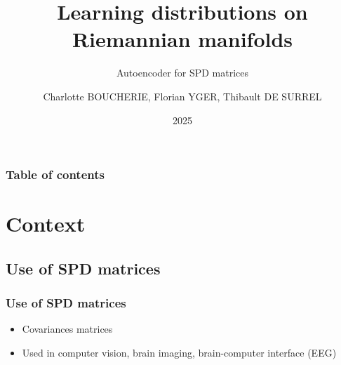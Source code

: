 \documentclass{beamer}
\title[AE SPDnet]
{Learning distributions on Riemannian manifolds}
\subtitle{Autoencoder for SPD matrices}
\author[CB]
{Charlotte BOUCHERIE, Florian YGER, Thibault DE SURREL}
\institute{LITIS}
\date[2025]
{2025}
\begin{document}
\frame{\titlepage}

\begin{frame}
\frametitle{Table of contents}
\tableofcontents
\end{frame}

\section{Context}
\subsection{Use of SPD matrices}
\begin{frame}
\frametitle{Use of SPD matrices}
    \begin{itemize}
        \item Covariances matrices
        \item Used in computer vision, brain imaging, brain-computer interface (EEG)
    \end{itemize}
\end{frame}

\end{document}
